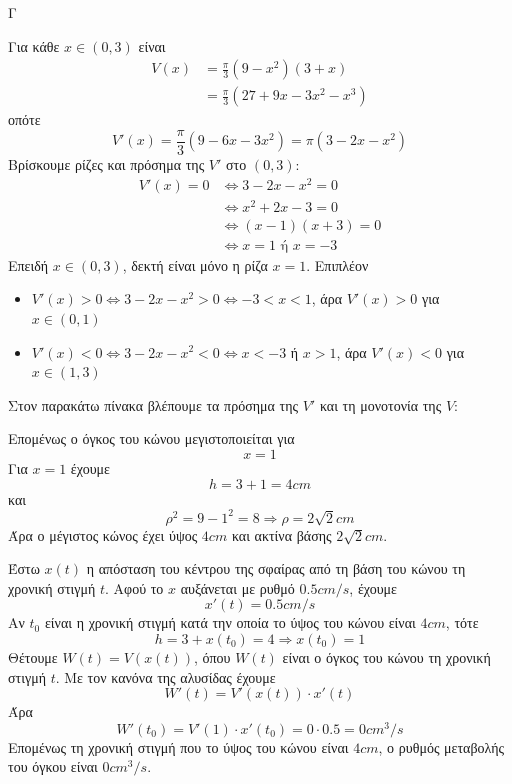 \begin{thema}{Γ}
\begin{erwthma}
\item Για κάθε $x\in(0,3)$ είναι
\begin{align*}
V(x)&=\frac{\pi}{3}(9-x^2)(3+x)\\
&=\frac{\pi}{3}(27+9x-3x^2-x^3)
\end{align*}
οπότε
\[V'(x)=\frac{\pi}{3}(9-6x-3x^2)=\pi(3-2x-x^2)\]
Βρίσκουμε ρίζες και πρόσημα της $V'$ στο $(0,3)$:
\begin{align*}
V'(x)=0
&\Leftrightarrow 3-2x-x^2=0\\
&\Leftrightarrow x^2+2x-3=0\\
&\Leftrightarrow (x-1)(x+3)=0\\
&\Leftrightarrow x=1 \text{ ή } x=-3
\end{align*}
Επειδή $x\in(0,3)$, δεκτή είναι μόνο η ρίζα $x=1$.
Επιπλέον
\begin{itemize}
\item $V'(x)>0\Leftrightarrow 3-2x-x^2>0\Leftrightarrow -3<x<1$, άρα $V'(x)>0$ για $x\in(0,1)$
\item $V'(x)<0\Leftrightarrow 3-2x-x^2<0\Leftrightarrow x<-3$ ή $x>1$, άρα $V'(x)<0$ για $x\in(1,3)$
\end{itemize}
Στον παρακάτω πίνακα βλέπουμε τα πρόσημα της $V'$ και τη μονοτονία της $V$:
\begin{center}
\end{center}
Επομένως ο όγκος του κώνου μεγιστοποιείται για
\[x=1\]
Για $x=1$ έχουμε
\[h=3+1=4\si{cm}\]
και
\[\rho^2=9-1^2=8\Rightarrow \rho=2\sqrt{2}\si{cm}\]
Άρα ο μέγιστος κώνος έχει ύψος $4\si{cm}$ και ακτίνα βάσης $2\sqrt{2}\si{cm}$.

\item Έστω $x(t)$ η απόσταση του κέντρου της σφαίρας από τη βάση του κώνου τη χρονική στιγμή $t$.
Αφού το $x$ αυξάνεται με ρυθμό $0.5\si{cm/s}$, έχουμε
\[x'(t)=0.5\si{cm/s}\]
Αν $t_0$ είναι η χρονική στιγμή κατά την οποία το ύψος του κώνου είναι $4\si{cm}$, τότε
\[h=3+x(t_0)=4\Rightarrow x(t_0)=1\]
Θέτουμε $W(t)=V(x(t))$, όπου $W(t)$ είναι ο όγκος του κώνου τη χρονική στιγμή $t$.
Με τον κανόνα της αλυσίδας έχουμε
\[W'(t)=V'(x(t))\cdot x'(t)\]
Άρα
\[W'(t_0)=V'(1)\cdot x'(t_0)=0\cdot 0.5=0\si{cm^3/s}\]
Επομένως τη χρονική στιγμή που το ύψος του κώνου είναι $4\si{cm}$, ο ρυθμός μεταβολής του όγκου είναι $0\si{cm^3/s}$.
\end{erwthma}
\end{thema}

